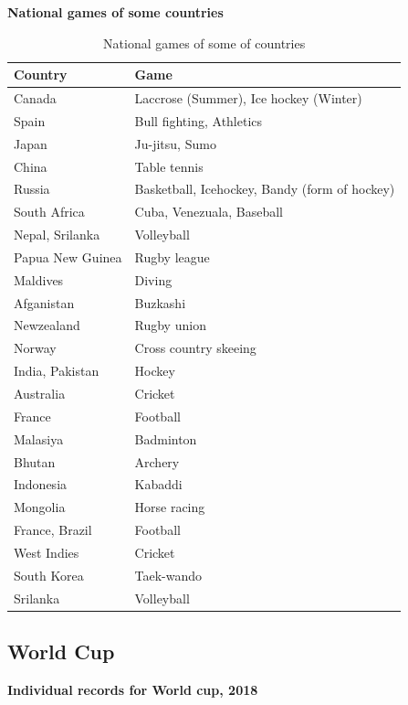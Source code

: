 \documentclass[
  openany]{book}
\begin{document}
\textbf{National games of some countries}

\begin{longtable}[t]{ll}
\caption{\label{tab:national-games}National games of some of countries}\\
\toprule
Country & Game\\
\midrule
Canada & Laccrose (Summer), Ice hockey (Winter)\\
Spain & Bull fighting, Athletics\\
Japan & Ju-jitsu, Sumo\\
China & Table tennis\\
Russia & Basketball, Icehockey, Bandy (form of hockey)\\
\addlinespace
South Africa & Cuba, Venezuala, Baseball\\
Nepal, Srilanka & Volleyball\\
Papua New Guinea & Rugby league\\
Maldives & Diving\\
Afganistan & Buzkashi\\
\addlinespace
Newzealand & Rugby union\\
Norway & Cross country skeeing\\
India, Pakistan & Hockey\\
Australia & Cricket\\
France & Football\\
\addlinespace
Malasiya & Badminton\\
Bhutan & Archery\\
Indonesia & Kabaddi\\
Mongolia & Horse racing\\
France, Brazil & Football\\
\addlinespace
West Indies & Cricket\\
South Korea & Taek-wando\\
Srilanka & Volleyball\\
\bottomrule
\end{longtable}

\hypertarget{world-cup}{%
\subsection{World Cup}\label{world-cup}}

\textbf{Individual records for World cup, 2018}
\end{document}
